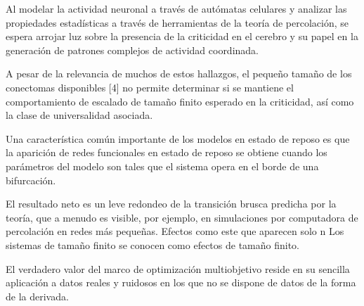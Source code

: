 Al modelar la actividad neuronal a través de autómatas celulares y analizar las propiedades estadísticas a través de herramientas de la teoría de percolación, se espera arrojar luz sobre la presencia de la criticidad en el cerebro y su papel en la generación de patrones complejos de actividad coordinada.


A pesar de la relevancia de muchos de estos hallazgos, el pequeño tamaño de los conectomas disponibles [4] no permite determinar si se mantiene el comportamiento de escalado de tamaño finito esperado en la criticidad, así como la clase de universalidad asociada.


Una característica común importante de los modelos en estado de reposo es que la aparición de redes funcionales en estado de reposo se obtiene cuando los parámetros del modelo son tales que el sistema opera en el borde de una bifurcación.

El resultado neto es un leve redondeo de la transición brusca predicha por la teoría, que a menudo es visible, por ejemplo, en simulaciones por computadora de percolación en redes más pequeñas. Efectos como este que aparecen solo n
Los sistemas de tamaño finito se conocen como efectos de tamaño finito.


El verdadero valor del marco de optimización multiobjetivo reside en su sencilla aplicación a datos reales y ruidosos en los que no se dispone de datos de la forma de la derivada.